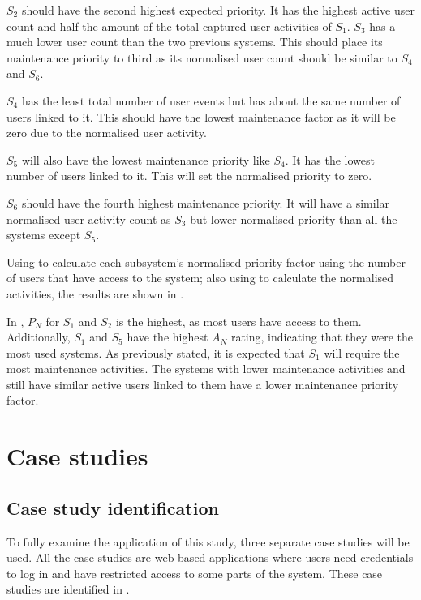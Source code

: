 $S_2$ should have the second highest expected priority. It has the highest active user count and half the amount of the total captured user activities of $S_1$. $S_3$ has a much lower user count than the two previous systems. This should place its maintenance priority to third as its normalised user count should be similar to $S_4$ and $S_6$.\par $S_4$ has the least total number of user events but has about the same number of users linked to it. This should have the lowest maintenance factor as it will be zero due to the normalised user activity. \par $S_5$ will also have the lowest maintenance priority like $S_4$. It has the lowest number of users linked to it. This will set the normalised priority to zero. \par $S_6$ should have the fourth highest maintenance priority. It will have a similar normalised user activity count as $S_3$ but lower normalised priority than all the systems except $S_5$. \par Using  to calculate each subsystem's normalised priority factor using the number of users that have access to the system; also using  to calculate the normalised activities, the results are shown in .



In , $P_N$ for $S_1$ and $S_2$ is the highest, as most users have access to them. Additionally, $S_1$ and $S_5$ have the highest $A_N$ rating, indicating that they were the most used systems. As previously stated, it is expected that $S_1$ will require the most maintenance activities. The systems with lower maintenance activities and still have similar active users linked to them have a lower maintenance priority factor.

\clearpage

\section{Case studies}\label{sec:ch3_caseStudies}

\subsection{Case study identification}
To fully examine the application of this study, three separate case studies will be used. All the case studies are web-based applications where users need credentials to log in and have restricted access to some parts of the system. These case studies are identified in .

